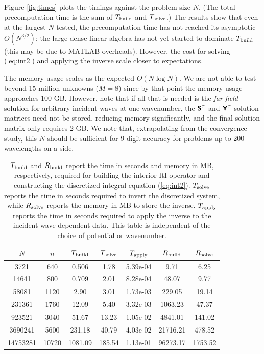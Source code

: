 \documentclass[11pt,final]{amsart}
\theoremstyle{definition}
\numberwithin{remark}{section}
\numberwithin{definition}{section}
\numberwithin{pro}{section}
\begin{document}
Figure \ref{fig:times} plots the timings against the problem size $N$.
(The total precomputation time is the sum of $T_{\rm build}$ and $T_{\rm solve}$.)
The results show that even at the largest $N$ tested, the
precomputation time has not reached its asymptotic $O(N^{3/2})$;
the large dense linear algebra has not yet started to dominate $T_{\rm build}$
(this may be due to MATLAB overheads).
However, the cost for solving (\ref{eq:int2}) and applying the inverse scale
closer to expectations.

The memory usage scales as the expected $O(N \log N)$.
We are not able to test beyond 15 million unknowns ($M=8$)
since by that point the memory usage approaches 100 GB.
However, note that if all that is needed is the {\em far-field} solution for
arbitrary incident waves at one wavenumber, the $\bm{\mathsf{S}}^\tau$ and $\bm{\mathsf{Y}}^\tau$ solution
matrices need not be stored, reducing memory significantly, and the final solution
matrix only requires 2 GB.
We note that, extrapolating from the convergence study, this $N$ should be
sufficient for 9-digit accuracy for problems up to 200 wavelengths on a side.


\begin{table}[ht]
\centering
 \begin{tabular}{|c|c|c|c|c|c|c|}
\hline
$N$& $n$ &$T_{\rm build}$ & $T_{\rm solve} $ &$T_{\rm apply}$ & $R_{\rm build}$ & $R_{\rm solve}$\\ \hline
3721&	640&	0.506&	1.78&	5.39e-04 & 9.71 & 6.25\\ %
14641&	800&	0.709&	2.01&	8.28e-04 & 48.07 & 9.77\\ %
58081&	1120&	2.90&	3.01&	1.73e-03 & 229.05& 19.14\\ %
231361&	1760&	12.09&	5.40&	3.32e-03 & 1063.23& 47.37\\ %
923521&	3040&	51.67&	13.23&	1.05e-02 & 4841.01& 141.02\\ %
3690241&5600&	231.18&	40.79&	4.03e-02 & 21716.21& 478.52\\ %
14753281&10720&	1081.09&185.54&	1.13e-01& 96273.17&1753.52\\ \hline
 \end{tabular}
\vspace{2ex}
\caption{\label{tab:times}$T_{\rm build}$ and $R_{\rm build}$ report the time in seconds and memory in MB, respectively, required
for building the interior ItI operator and constructing the discretized integral equation (\ref{eq:int2}).
$T_{\rm solve}$ reports the time in seconds required to invert the discretized system, while $R_{\rm solve}$
reports the memory in MB to store the inverse.  $T_{\rm apply}$ reports the time in seconds required to apply the
inverse to the incident wave dependent data. This table is independent of the choice of
potential or wavenumber.}
\end{table}
\end{document}
